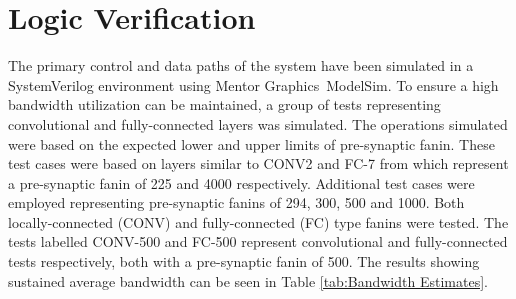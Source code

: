

\section{Logic Verification}
\label{sec:Logic Verification}

The primary control and data paths of the system have been simulated in a SystemVerilog environment using Mentor Graphics\textregistered ~ModelSim\texttrademark.
To ensure a high bandwidth utilization can be maintained, a group of tests representing convolutional and fully-connected layers was simulated.
The operations simulated were based on the expected lower and upper limits of pre-synaptic fanin. 
These test cases were based on layers similar to CONV2 and FC-7 from \cite{krizhevsky2012imagenet} which represent a pre-synaptic fanin of 225 and 4000 respectively.
Additional test cases were employed representing pre-synaptic fanins of 294, 300, 500 and 1000. Both locally-connected (CONV) and fully-connected (FC) type fanins were tested.
The tests labelled CONV-500 and FC-500 represent convolutional and fully-connected tests respectively, both with a pre-synaptic fanin of 500.
The results showing sustained average bandwidth can be seen in Table \ref{tab:Bandwidth Estimates}.


